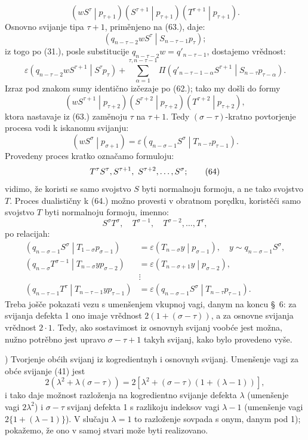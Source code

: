 \documentclass[11pt]{article}
\newcommand{\pair}[2]{\left(#1\middle|#2\right)}
\newcommand{\eps}{\varepsilon}
\begin{document}
\begin{equation}
 \pair{wS^\tau}{p_{\tau+1}}\pair{S^{\tau+1}}{p_{\tau+1}}\pair{T^{\tau+1}}{p_{\tau+1}}.
\tag{63}
\end{equation}
Osnovno svijanje tipa $\tau+1$, priměnjeno na (63.), daje:
\[
 \pair{q_{n-\tau-2}wS^\tau}{S_{n-\tau-1}p_\tau};
\]
iz togo po (31.), posle substitucije $q_{n-\tau-2}w=q'_{n-\tau-1}$, dostajemo vrědnost:
\[
 \eps\pair{q_{n-\tau-2}wS^{\tau+1}}{S^\tau p_\tau}
 +\sum_{\alpha=1}^{\tau,n-\tau-1}\Pi\pair{q'_{n-\tau-1-\alpha}S^{\tau+1}}{S_{n-\tau}p_{\tau-\alpha}}.
\]
Izraz pod znakom sumy identično izčezaje po (62.); tako my došli do formy
\[
 \pair{wS^{\tau+1}}{p_{\tau+2}}\pair{S^{\tau+2}}{p_{\tau+2}}\pair{T^{\tau+2}}{p_{\tau+2}},
\]
ktora nastavaje iz (63.) zaměnoju $\tau$ na $\tau+1$. Tedy $(\sigma-\tau)$-kratno povtorjenje procesa vodi k iskanomu svijanju:
\[
 \pair{wS^\sigma}{p_{\sigma+1}}=\eps\pair{q_{n-\sigma-1}S^\sigma}{T_{n-\tau}p_{\tau-1}}.
\]
Provedeny proces kratko označamo formuloju:
\begin{equation}
 T^\tau S^\tau,\\ S^{\tau+1},\ S^{\tau+2},\ldots,S^\sigma;
\tag{64}
\end{equation}
vidimo, že koristi se samo svojstvo $S$ byti normalnoju formoju, a ne tako svojstvo $T$. Proces dualističny k (64.) možno provesti v obratnom porędku, koristěći samo svojstvo $T$ byti normalnoju formoju, imenno:
\begin{equation}
 S^\sigma T^\sigma,
\quad T^{\sigma-1},\quad T^{\sigma-2},\ldots,T^\tau,
\tag{65}
\end{equation}
po relacijah:
\begin{align*}
\pair{q_{n-\sigma-1}S^\sigma}{T_{1-\sigma}p_{\sigma-1}}&=\eps\pair{T_{n-\sigma}y}{p_{\sigma-1}},\quad y\sim q_{n-\sigma-1}S^\sigma,\\
\pair{q_{n-\sigma}T^{\sigma-1}}{T_{n-\sigma}yp_{\sigma-2}}&=\eps\pair{T_{n-\sigma+1}y}{p_{\sigma-2}},\\
&\vdots\\
\pair{q_{n-\tau-1}T^\tau}{T_{n-\tau-1}yp_{\tau-1}}&=\eps\pair{q_{n-\sigma-1}S^\sigma}{T_{n-\tau}p_{\tau-1}}.
\end{align*}
Treba jošče pokazati vezu s umenšenjem vkupnoj vagi, danym na koncu \S\ 6: za svijanja defekta 1 ono imaje vrědnost $2(1+(\sigma-\tau))$, a za osnovne svijanja vrědnost $2\cdot1$. Tedy, ako sostavimost iz osnovnyh svijanj voobće jest možna, nužno potrěbno jest upravo $\sigma-\tau+1$ takyh svijanj, kako bylo provedeno vyše.

) Tvorjenje obćih svijanj iz kogredientnyh i osnovnyh svijanj. Umenšenje vagi za obće svijanje (41) jest
\[
2(\lambda^2+\lambda(\sigma-\tau))
=2[\lambda^2+(\sigma-\tau)(1+(\lambda-1))],
\]
i tako daje možnost razloženja na kogredientno svijanje defekta $\lambda$ (umenšenje vagi $2\lambda^2$) i $\sigma-\tau$ svijanj defekta 1 s razlikoju indeksov vagi $\lambda-1$ (umenšenje vagi $2\{1+(\lambda-1)\}$). V slučaju $\lambda=1$ to razloženje sovpada s onym, danym pod 1); pokažemo, že ono v samoj stvari može byti realizovano.
\end{document}
